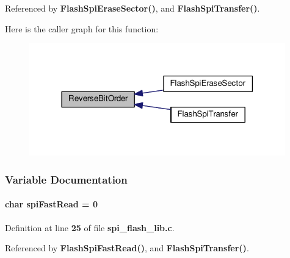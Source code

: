 Referenced by {\bf Flash\+Spi\+Erase\+Sector()}, and {\bf Flash\+Spi\+Transfer()}.



Here is the caller graph for this function\+:
\nopagebreak
\begin{figure}[H]
\begin{center}
\leavevmode
\includegraphics[width=314pt]{dc/d9a/spi__flash__lib_8c_aeee713216278f8150b70acddaf73af3b_icgraph}
\end{center}
\end{figure}




\subsubsection{Variable Documentation}
\paragraph[{spi\+Fast\+Read}]{\setlength{\rightskip}{0pt plus 5cm}char spi\+Fast\+Read = 0}\label{spi__flash__lib_8c_a11c686f3ba671af8e58d00cbb325767e}


Definition at line {\bf 25} of file {\bf spi\+\_\+flash\+\_\+lib.\+c}.



Referenced by {\bf Flash\+Spi\+Fast\+Read()}, and {\bf Flash\+Spi\+Transfer()}.

